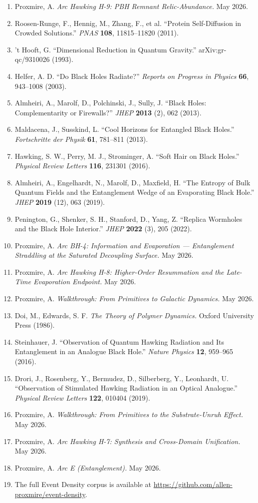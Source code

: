 \documentclass[11pt,a4paper]{article}
\begin{document}
\begin{enumerate}[noitemsep,leftmargin=*]
\item Proxmire, A. \textit{Arc Hawking H-9: PBH Remnant Relic-Abundance.} May 2026.
\item Roosen-Runge, F., Hennig, M., Zhang, F., et al. ``Protein Self-Diffusion in Crowded Solutions.'' \textit{PNAS} \textbf{108}, 11815--11820 (2011).
\item 't Hooft, G. ``Dimensional Reduction in Quantum Gravity.'' arXiv:gr-qc/9310026 (1993).
\item Helfer, A. D. ``Do Black Holes Radiate?'' \textit{Reports on Progress in Physics} \textbf{66}, 943--1008 (2003).
\item Almheiri, A., Marolf, D., Polchinski, J., Sully, J. ``Black Holes: Complementarity or Firewalls?'' \textit{JHEP} \textbf{2013} (2), 062 (2013).
\item Maldacena, J., Susskind, L. ``Cool Horizons for Entangled Black Holes.'' \textit{Fortschritte der Physik} \textbf{61}, 781--811 (2013).
\item Hawking, S. W., Perry, M. J., Strominger, A. ``Soft Hair on Black Holes.'' \textit{Physical Review Letters} \textbf{116}, 231301 (2016).
\item Almheiri, A., Engelhardt, N., Marolf, D., Maxfield, H. ``The Entropy of Bulk Quantum Fields and the Entanglement Wedge of an Evaporating Black Hole.'' \textit{JHEP} \textbf{2019} (12), 063 (2019).
\item Penington, G., Shenker, S. H., Stanford, D., Yang, Z. ``Replica Wormholes and the Black Hole Interior.'' \textit{JHEP} \textbf{2022} (3), 205 (2022).
\item Proxmire, A. \textit{Arc BH-4: Information and Evaporation --- Entanglement Straddling at the Saturated Decoupling Surface.} May 2026.
\item Proxmire, A. \textit{Arc Hawking H-8: Higher-Order Resummation and the Late-Time Evaporation Endpoint.} May 2026.
\item Proxmire, A. \textit{Walkthrough: From Primitives to Galactic Dynamics.} May 2026.
\item Doi, M., Edwards, S. F. \textit{The Theory of Polymer Dynamics.} Oxford University Press (1986).
\item Steinhauer, J. ``Observation of Quantum Hawking Radiation and Its Entanglement in an Analogue Black Hole.'' \textit{Nature Physics} \textbf{12}, 959--965 (2016).
\item Drori, J., Rosenberg, Y., Bermudez, D., Silberberg, Y., Leonhardt, U. ``Observation of Stimulated Hawking Radiation in an Optical Analogue.'' \textit{Physical Review Letters} \textbf{122}, 010404 (2019).
\item Proxmire, A. \textit{Walkthrough: From Primitives to the Substrate-Unruh Effect.} May 2026.
\item Proxmire, A. \textit{Arc Hawking H-7: Synthesis and Cross-Domain Unification.} May 2026.
\item Proxmire, A. \textit{Arc E (Entanglement).} May 2026.
\item The full Event Density corpus is available at \url{https://github.com/allen-proxmire/event-density}.
\end{enumerate}
\end{document}
